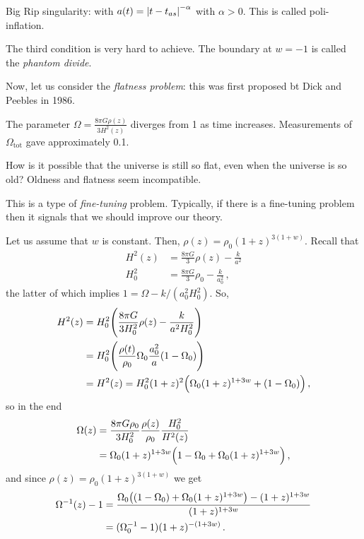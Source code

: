 \documentclass[main.tex]{subfiles}
\begin{document}
Big Rip singularity: with \(a(t) = \abs{t - t_{as}}^{- \alpha } \) with \(\alpha >0\). This is called poli-inflation.


The third condition is very hard to achieve.
The boundary at \(w = -1\) is called the \emph{phantom divide}.

Now, let us consider the \emph{flatness problem}:
this was first proposed bt Dick and Peebles in 1986.

The parameter \(\Omega = \frac{8 \pi G \rho(z) }{3 H^2(z)} \) diverges from 1 as time increases.
Measurements of \(\Omega _{\text{tot}}\) gave approximately 0.1.

How is it possible that the universe is still so flat, even when the universe is so old? Oldness and flatness seem incompatible.

This is a type of \emph{fine-tuning} problem. Typically, if there is a fine-tuning problem then it signals that we should improve our theory.

Let us assume that \(w\) is constant. Then, \(\rho (z) = \rho_{0} (1+z)^{3(1+w)}\). Recall that 
%
\begin{subequations}
\begin{align}
  H^2(z) &= \frac{8 \pi G }{3} \rho (z) - \frac{k}{a^2}  \\
  H_0^2 &= \frac{8 \pi G}{3}\rho_0 - \frac{k}{a_0^2}
\,,
\end{align}
\end{subequations}
%
the latter of which implies \(1 = \Omega - k / (a_0^2 H_0^2)\). So, 
%
\begin{subequations}
\begin{align}
  H^2(z) &= H_0^2 \qty(\frac{8 \pi G }{3 H_0^2} \rho (z) - \frac{k}{a^2 H_0^2}) \\
  &= H_0^2 \qty(\frac{\rho (t)}{\rho_0 }\Omega_0 \frac{a_0^2}{a} (1-\Omega_0 ))  \\
  &= H^2(z) = H_0^2 (1+z)^2 \qty(\Omega_0 (1+z)^{1+3w} + (1-\Omega_0 ))
\,,
\end{align}
\end{subequations}
%
so in the end 
%
\begin{subequations}
\begin{align}
  \Omega (z) &= \frac{8 \pi G \rho_0 }{3 H_0^2 } \frac{\rho (z)}{\rho_0 } \frac{H_0^2}{H^2(z)} \\
  &=\Omega_0 (1+z)^{1+3w} \qty(1-\Omega_0 + \Omega_0 (1+z)^{1+3w}) 
\,,
\end{align}
\end{subequations}
%
and since \(\rho (z) = \rho_0 (1+z)^{3(1+w)}\) we get 
%
\begin{subequations}
\begin{align}
  \Omega^{-1} (z) -1 &= \frac{\Omega_0 \qty((1-\Omega_0 ) + \Omega_0 (1+z)^{1+3w}) - (1+z)^{1+3w} }{(1+z)^{1+3w}}  \\
  &= (\Omega_0^{-1} -1) (1+z)^{-(1+3w)}
\,.
\end{align}
\end{subequations}
\end{document}
